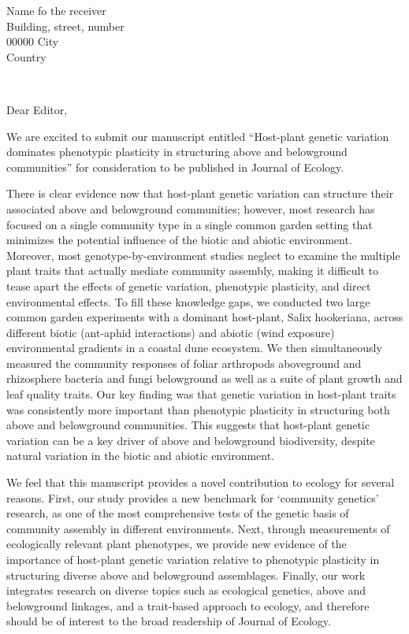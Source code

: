 \documentclass[english,uzh-en]{scrlttr2}
\begin{document}
\fosfamily
\begin{letter}{\fosfamily \begin{spacing}{0.8}{\vspace *{-1.2cm}Name fo the receiver\\  %
       Building, street, number\\  %
       00000 City\\
       Country} \end{spacing} ~} %
\opening{}



Dear Editor,

We are excited to submit our manuscript entitled “Host-plant genetic variation dominates phenotypic plasticity in structuring above and belowground communities” for consideration to be published in Journal of Ecology.

There is clear evidence now that host-plant genetic variation can structure their associated above and belowground communities; however, most research has focused on a single community type in a single common garden setting that minimizes the potential influence of the biotic and abiotic environment. Moreover, most genotype-by-environment studies neglect to examine the multiple plant traits that actually mediate community assembly, making it difficult to tease apart the effects of genetic variation, phenotypic plasticity, and direct environmental effects. To fill these knowledge gaps, we conducted two large common garden experiments with a dominant host-plant, Salix hookeriana, across different biotic (ant-aphid interactions) and abiotic (wind exposure) environmental gradients in a coastal dune ecosystem. We then simultaneously measured the community responses of foliar arthropods aboveground and rhizosphere bacteria and fungi belowground as well as a suite of plant growth and leaf quality traits. Our key finding was that genetic variation in host-plant traits was consistently more important than phenotypic plasticity in structuring both above and belowground communities. This suggests that host-plant genetic variation can be a key driver of above and belowground biodiversity, despite natural variation in the biotic and abiotic environment.

We feel that this manuscript provides a novel contribution to ecology for several reasons. First, our study provides a new benchmark for ‘community genetics’ research, as one of the most comprehensive tests of the genetic basis of community assembly in different environments. Next, through measurements of ecologically relevant plant phenotypes, we provide new evidence of the importance of host-plant genetic variation relative to phenotypic plasticity in structuring diverse above and belowground assemblages. Finally, our work integrates research on diverse topics such as ecological genetics, above and belowground linkages, and a trait-based approach to ecology, and therefore should be of interest to the broad readership of Journal of Ecology.


\end{letter}
\end{document}
